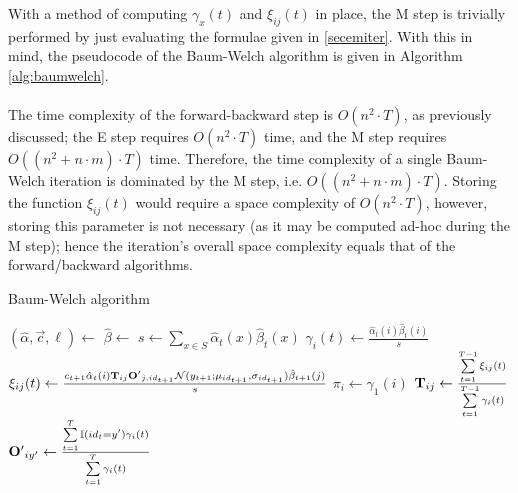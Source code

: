 \documentclass[12pt,a4paper,twoside,openright]{report}
\begin{document}
With a method of computing $\gamma_x(t)$ and $\xi_{ij}(t)$ in place, the M step is trivially performed by just evaluating the formulae given in \cref{secemiter}. With this in mind, the pseudocode of the Baum-Welch algorithm is given in Algorithm \ref{alg:baumwelch}.\\ \\
The time complexity of the forward-backward step is $O(n^2\cdot T)$, as previously discussed; the E step requires $O(n^2\cdot T)$ time, and the M step requires $O((n^2 + n\cdot m)\cdot T)$ time. Therefore, the time complexity of a single Baum-Welch iteration is dominated by the M step, i.e. $O((n^2 + n\cdot m)\cdot T)$. Storing the function $\xi_{ij}(t)$ would require a space complexity of $O(n^2\cdot T)$, however, storing this parameter is not necessary (as it may be computed ad-hoc during the M step); hence the iteration's overall space complexity equals that of the forward/backward algorithms.
\begin{algorithm}[H]
\caption{Baum-Welch algorithm}\label{alg:baumwelch}
\begin{algorithmic}[1]
 
	\State $(\hat{\alpha}, \vec{c}, \ell)\gets$  
	\State $\hat{\beta}\gets$  
	 
			\State $s\gets \sum\limits_{x\in S}{\hat{\alpha}_t(x)\hat{\beta}_t(x)}$
			\State $\gamma_i(t)\gets\frac{\hat{\alpha}_t(i)\hat{\beta}_t(i)}{s}$
				\State $\xi_{ij}(t)\gets \frac{c_{t+1}\hat{\alpha}_t(i){\bf T}_{ij}{\bf O'}_{j,id_{t+1}}\mathcal{N}(y_{t+1}; \mu_{id_{t+1}}, \sigma_{id_{t+1}})\hat{\beta}_{t+1}(j)}{s}$
			\EndFor
		\EndFor
	\EndFor
	 
		\State $\pi_i\gets \gamma_1(i)$
			\State ${\bf T}_{ij}\gets\frac{\sum\limits_{t=1}^{T-1}{\xi_{ij}(t)}}{\sum\limits_{t=1}^{T-1}{\gamma_i(t)}}$
		\EndFor
			\State ${\bf O'}_{iy'}\gets\frac{\sum\limits_{t=1}^{T}{\mathbb{I}(id_t=y')\gamma_i(t)}}{\sum\limits_{t=1}^T{\gamma_i(t)}}$
		\EndFor
	\EndFor
\EndProcedure
\end{algorithmic}
\end{algorithm}
\end{document}
